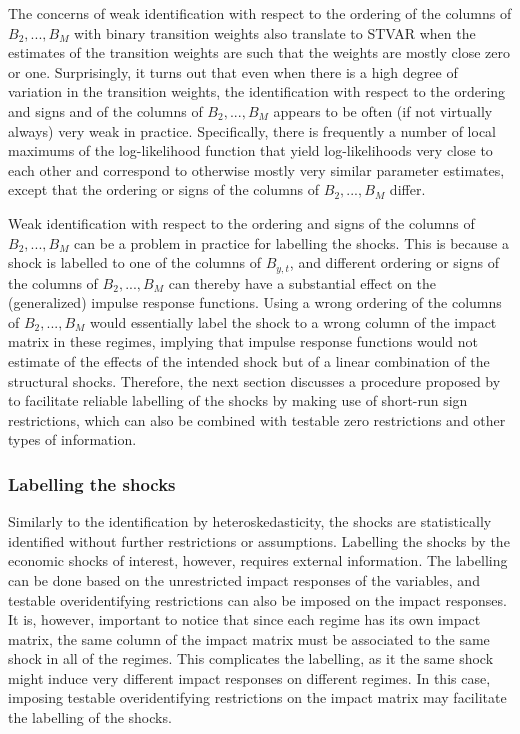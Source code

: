 \documentclass[nojss]{jss}
\begin{document}
The concerns of weak identification with respect to the ordering of the columns of $B_2,...,B_M$ with binary transition weights also translate to STVAR when the estimates of the transition weights are such that the weights are mostly close zero or one. Surprisingly, it turns out that even when there is a high degree of variation in the transition weights, the identification with respect to the ordering and signs and of the columns of $B_2,...,B_M$ appears to be often (if not virtually always) very weak in practice. Specifically, there is frequently a number of local maximums of the log-likelihood function that yield log-likelihoods very close to each other and correspond to otherwise mostly very similar parameter estimates, except that the ordering or signs of the columns of $B_2,...,B_M$ differ.

Weak identification with respect to the ordering and signs of the columns of $B_2,...,B_M$ can be a problem in practice for labelling the shocks. This is because a shock is labelled to one of the columns of $B_{y,t}$, and different ordering or signs of the columns of $B_2,...,B_M$ can thereby have a substantial effect on the (generalized) impulse response functions. Using a wrong ordering of the columns of $B_2,...,B_M$ would essentially label the shock to a wrong column of the impact matrix in these regimes, implying that impulse response functions would not estimate of the effects of the intended shock but of a linear combination of the structural shocks. Therefore, the next section discusses a procedure proposed by \cite{Virolainen2:2024} to facilitate reliable labelling of the shocks by making use of short-run sign restrictions, which can also be combined with testable zero restrictions and other types of information.

\subsubsection{Labelling the shocks}
Similarly to the identification by heteroskedasticity, the shocks are statistically identified without further restrictions or assumptions. Labelling the shocks by the economic shocks of interest, however, requires external information. The labelling can be done based on the unrestricted impact responses of the variables, and testable overidentifying restrictions can also be imposed on the impact responses. It is, however, important to notice that since each regime has its own impact matrix, the same column of the impact matrix must be associated to the same shock in all of the regimes. This complicates the labelling, as it the same shock might induce very different impact responses on different regimes. In this case, imposing testable overidentifying restrictions on the impact matrix may facilitate the labelling of the shocks.
\end{document}
